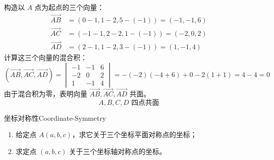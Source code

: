 \begin{solution}
    构造以 $A$ 点为起点的三个向量：
    \begin{equation}
        \begin{aligned}
            \overrightarrow{AB} & = (0-1, 1-2, 5-(-1)) = (-1, -1, 6) \\
            \overrightarrow{AC} & = (-1-1, 2-2, 1-(-1)) = (-2, 0, 2) \\
            \overrightarrow{AD} & = (2-1, 1-2, 3-(-1)) = (1, -1, 4)
        \end{aligned}
    \end{equation}
    计算这三个向量的混合积：
    \begin{equation}
        (\overrightarrow{AB}, \overrightarrow{AC}, \overrightarrow{AD}) = \begin{vmatrix} -1 & -1 & 6 \\ -2 & 0 & 2 \\ 1 & -1 & 4 \end{vmatrix} = -(-2)(-4 + 6) + 0 - 2(1 + 1) = 4 - 4 = 0
    \end{equation}
    由于混合积为零，表明向量 $\overrightarrow{AB}, \overrightarrow{AC}, \overrightarrow{AD}$ 共面。
    \begin{equation}
        \boxed{A, B, C, D \text{ 四点共面}}
    \end{equation}
\end{solution}

\begin{problem}{坐标对称性}{Coordinate-Symmetry}
    \begin{enumerate}
        \item 给定点 $A(a, b, c)$，求它关于三个坐标平面对称点的坐标；
        \item 求定点 $(a, b, c)$ 关于三个坐标轴对称点的坐标。
    \end{enumerate}
\end{problem}

